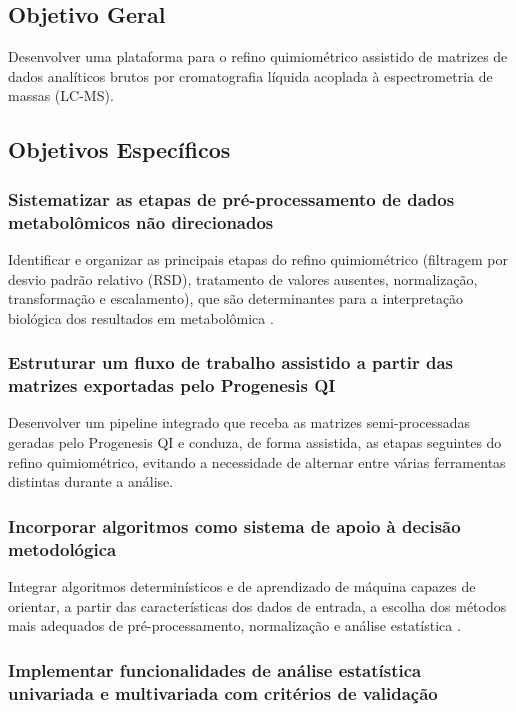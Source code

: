 \subsection{Objetivo Geral}

Desenvolver uma plataforma para o refino quimiométrico assistido de matrizes de dados analíticos brutos por cromatografia líquida acoplada à espectrometria de massas (LC-MS).

\subsection{Objetivos Específicos}

\subsubsection{Sistematizar as etapas de pré-processamento de dados metabolômicos não direcionados}
 
Identificar e organizar as principais etapas do refino quimiométrico (filtragem por desvio padrão relativo (RSD), tratamento de valores ausentes, normalização, transformação e escalamento), que são determinantes para a interpretação biológica dos resultados em metabolômica \cite{vandenberg2006centering}.



\subsubsection{Estruturar um fluxo de trabalho assistido a partir das matrizes exportadas pelo Progenesis QI}
 
Desenvolver um pipeline integrado que receba as matrizes semi-processadas geradas pelo Progenesis QI e conduza, de forma assistida, as etapas seguintes do refino quimiométrico, evitando a necessidade de alternar entre várias ferramentas distintas durante a análise.
 

\subsubsection{Incorporar algoritmos como sistema de apoio à decisão metodológica}
 
Integrar algoritmos determinísticos e de aprendizado de máquina capazes de orientar, a partir das características dos dados de entrada, a escolha dos métodos mais adequados de pré-processamento, normalização e análise estatística \cite{galal2022applications}.


\subsubsection{Implementar funcionalidades de análise estatística univariada e multivariada com critérios de validação}
 
